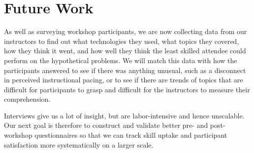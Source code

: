 \documentclass[10pt, twocolumn]{article}
\begin{document}
\section{Future Work}

As well as surveying workshop participants,
we are now collecting data from our instructors
to find out what technologies they used,
what topics they covered,
how they think it went,
and how well they think the least skilled attendee could perform on the hypothetical problems.
We will match this data with how the participants answered to see if there was anything unusual,
such as a disconnect in perceived instructional pacing,
or to see if there are trends of topics that are difficult for participants to grasp
and difficult for the instructors to measure their comprehension.

Interviews give us a lot of insight,
but are labor-intensive and hence unscalable.
Our next goal is therefore to construct and validate better pre- and post-workshop questionnaires
so that we can track skill uptake and participant satisfaction
more systematically on a larger scale.

{\small
	
	
}
\end{document}
